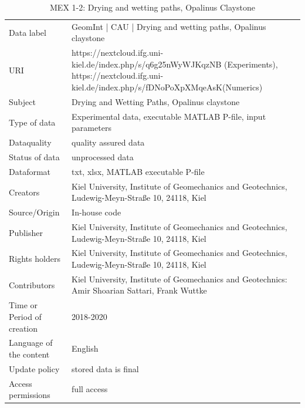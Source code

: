 \begin{table}[!ht]
\caption{MEX 1-2: Drying and wetting paths, Opalinus Claystone}
\label{tab:dms-mex1-2}
\small
\begin{tabular}{R{3cm}|L{7cm}}
\hline
%
Data label & GeomInt | CAU | Drying and wetting paths, Opalinus claystone\\
URI &  https://nextcloud.ifg.uni-kiel.de/index.php/s/q6g25nWyWJKqzNB (Experiments), https://nextcloud.ifg.uni-kiel.de/index.php/s/fDNoPoXpXMqeAsK(Numerics)
\\
Subject  &  Drying and Wetting Paths, Opalinus claystone\\
Type of data  & Experimental data, executable MATLAB P-file, input parameters\\
Dataquality  &  quality assured data \\
Status of data  &  unprocessed data\\
Dataformat  & txt, xlsx, MATLAB executable P-file\\
Creators  &  Kiel University, Institute of Geomechanics and Geotechnics, Ludewig-Meyn-Stra\ss e 10, 24118, Kiel\\
Source/Origin & In-house code \\
Publisher  &  Kiel University, Institute of Geomechanics and Geotechnics, Ludewig-Meyn-Stra\ss e 10, 24118, Kiel \\
Rights holders &  Kiel University, Institute of Geomechanics and Geotechnics, Ludewig-Meyn-Stra\ss e 10, 24118, Kiel \\
Contributors &   Kiel University, Institute of Geomechanics and Geotechnics: Amir Shoarian Sattari, Frank Wuttke\\
Time or Period of creation &  2018-2020\\
Language of the content &  English\\
Update policy &  stored data is final\\
Access permissions & full access\\
%
\hline
\end{tabular}
\end{table}